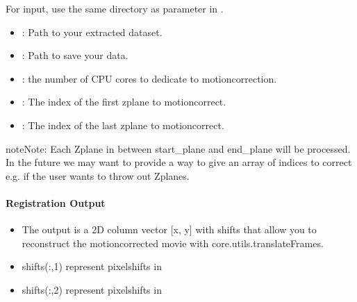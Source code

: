 \documentclass[letterpaper,10pt,english]{sphinxmanual}
\begin{document}
\sphinxAtStartPar
For input, use the same directory as  parameter in {\hyperref[\detokenize{api/core:convertScanImageTiffToVolume}]{}}.
\begin{itemize}
\item {} 
\sphinxAtStartPar
{}: Path to your extracted dataset.

\item {} 
\sphinxAtStartPar
{}: Path to save your data.

\item {} 
\sphinxAtStartPar
{}: the number of CPU cores to dedicate to motion\sphinxhyphen{}correction.

\item {} 
\sphinxAtStartPar
{}: The index of the first z\sphinxhyphen{}plane to motion\sphinxhyphen{}correct.

\item {} 
\sphinxAtStartPar
{}: The index of the last z\sphinxhyphen{}plane to motion\sphinxhyphen{}correct.

\end{itemize}

\begin{sphinxadmonition}{note}{Note:}
\sphinxAtStartPar
Each Z\sphinxhyphen{}plane in between start\_plane and end\_plane will be processed. In the future we may want to provide a way to give an array of indices to correct e.g. if the user wants to throw out Z\sphinxhyphen{}planes.
\end{sphinxadmonition}


\paragraph{Registration Output}
\label{\detokenize{user_guide/pre_processing:registration-output}}\begin{itemize}
\item {} 
\sphinxAtStartPar
The output is a 2D column vector {[}x, y{]} with shifts that allow you to reconstruct the motion\sphinxhyphen{}corrected movie with \label{\detokenize{user_guide/pre_processing:core-utils-translateframes}}core.utils.translateFrames.

\item {} 
\sphinxAtStartPar
shifts(:,1) represent pixel\sphinxhyphen{}shifts in 

\item {} 
\sphinxAtStartPar
shifts(:,2) represent pixel\sphinxhyphen{}shifts in 

\end{itemize}
\end{document}
